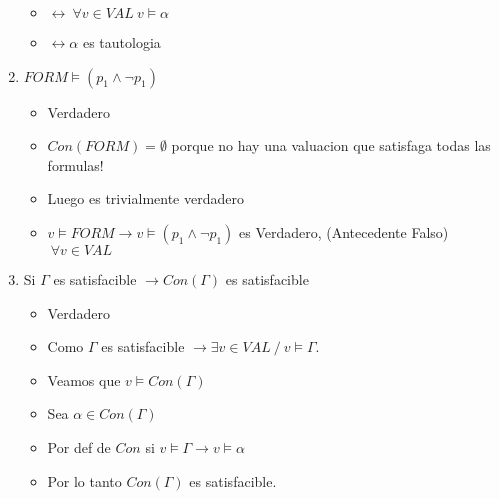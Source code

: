 \documentclass[14pt,a4paper,fleqn]{article}
\newcommand{\entonces}{\rightarrow}
\newcommand{\satisface}{\vDash}
\newcommand{\conSeman}{\vDash}
\newcommand{\y}{\wedge}
\newcommand{\sii}{\leftrightarrow}
\newcommand{\tq}{\ensuremath{\: / \:}}
\newcommand{\val}{\ensuremath{v \in VAL }}
\newcommand{\paraTodo}{\ensuremath{\: \forall}}
\newcommand{\vacio}{\emptyset}
\begin{document}
\begin{enumerate}
\begin{itemize}
		\item $\sii \paraTodo \val \: v \satisface \alpha$
		\item $\sii \alpha $ es tautologia
	\end{itemize}
	\item $ FORM \conSeman (p_{1} \y \neg p_{1})$
	\begin{itemize}
		\item Verdadero
		\item $Con(FORM) = \vacio $ porque no hay una valuacion que satisfaga todas las formulas!
		\item Luego es trivialmente verdadero
		\item $v \satisface FORM \entonces v \satisface (p_1 \y \neg p_1) $ es Verdadero, (Antecedente Falso) $\paraTodo \val$
	\end{itemize}
	\item Si $\Gamma$ es satisfacible $\entonces Con(\Gamma)$ es satisfacible
	\begin{itemize}
		\item Verdadero
		\item Como $\Gamma$ es satisfacible $\entonces \exists \val \tq v \satisface \Gamma$. 
		\item Veamos que $v \satisface Con(\Gamma)$
		\item Sea $\alpha \in Con(\Gamma)$
		\item Por def de $Con$ si $v \satisface \Gamma \entonces v \satisface \alpha$
		\item Por lo tanto $Con(\Gamma)$	 es satisfacible.
	\end{itemize}

\end{enumerate}
\end{document}
